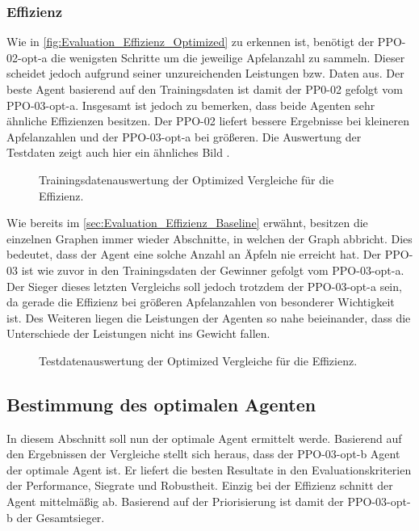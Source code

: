 \subsubsection{Effizienz}
Wie in \autoref{fig:Evaluation_Effizienz_Optimized} zu erkennen ist, benötigt der PPO-02-opt-a die wenigsten Schritte um die jeweilige Apfelanzahl zu sammeln. Dieser scheidet jedoch aufgrund seiner unzureichenden Leistungen bzw. Daten aus. Der beste Agent basierend auf den Trainingsdaten ist damit der PP0-02 gefolgt vom PPO-03-opt-a. 
Insgesamt ist jedoch zu bemerken, dass beide Agenten sehr ähnliche Effizienzen besitzen. Der PPO-02 liefert bessere Ergebnisse bei kleineren Apfelanzahlen und der PPO-03-opt-a bei größeren. Die Auswertung der Testdaten zeigt auch hier ein ähnliches Bild .
\begin{figure}[H]
\centering

\caption[Effizienz - Auswertung der Trainingsdaten der Optimized Vergleiche]{Trainingsdatenauswertung der Optimized Vergleiche für die Effizienz.}
\label{fig:Evaluation_Effizienz_Optimized}
\end{figure}
 
Wie bereits im \autoref{sec:Evaluation_Effizienz_Baseline} erwähnt, besitzen die einzelnen Graphen immer wieder Abschnitte, in welchen der Graph abbricht. Dies bedeutet, dass der Agent eine solche Anzahl an Äpfeln nie erreicht hat.
Der PPO-03 ist wie zuvor in den Trainingsdaten der Gewinner gefolgt vom PPO-03-opt-a. Der Sieger dieses letzten Vergleichs soll jedoch trotzdem der PPO-03-opt-a sein, da gerade die Effizienz bei größeren Apfelanzahlen von besonderer Wichtigkeit ist. Des Weiteren liegen die Leistungen der Agenten so nahe beieinander, dass die Unterschiede der Leistungen nicht ins Gewicht fallen.
\begin{figure}[H]
	\centering
	
	\caption[Effizienz - Auswertung der Testdaten der Optimized Vergleiche]{Testdatenauswertung der Optimized Vergleiche für die Effizienz.}
	\label{fig:Evaluation_Effizienz2_Optimized}
\end{figure}

\subsection{Bestimmung des optimalen Agenten} \label{subsec:Evaluation_Bestimmung_optimaler_Agent}
In diesem Abschnitt soll nun der optimale Agent ermittelt werde. Basierend auf den Ergebnissen der Vergleiche stellt sich heraus, dass der PPO-03-opt-b Agent der optimale Agent ist. Er liefert die besten Resultate in den Evaluationskriterien der Performance, Siegrate und Robustheit. Einzig bei der Effizienz schnitt der Agent mittelmäßig ab. Basierend auf der Priorisierung  ist damit der PPO-03-opt-b der Gesamtsieger.

